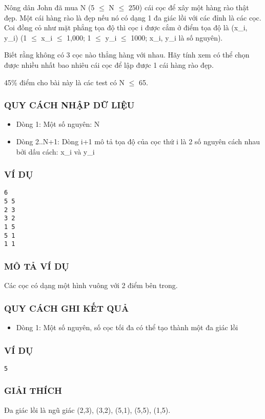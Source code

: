 



   Nông dân John đã mua N (5  $\le$  N  $\le$  250) cái cọc để xây một hàng rào thật đẹp. Một cái hàng rào là đẹp nếu nó có dạng 1 đa giác lồi với các đỉnh là các cọc. Coi đồng cỏ như mặt phẳng tọa độ thì cọc i được cắm ở điểm tọa độ là (x\_i, y\_i) (1  $\le$  x\_i  $\le$  1,000; 1  $\le$  y\_i  $\le$  1000; x\_i, y\_i là số nguyên).  

   Biết rằng không có 3 cọc nào thẳng hàng với nhau. Hãy tính xem có thể chọn được nhiều nhất bao nhiêu cái cọc để lập được 1 cái hàng rào đẹp.  

   45\% điểm cho bài này là các test có N  $\le$  65.  

\subsubsection{   QUY CÁCH NHẬP DỮ LIỆU  }
\begin{itemize}
	\item     Dòng 1: Một số nguyên: N   
	\item     Dòng 2..N+1: Dòng i+1 mô tả tọa độ của cọc thứ i là 2 số nguyên         cách nhau bởi dấu cách: x\_i và y\_i   
\end{itemize}

\subsubsection{   VÍ DỤ  }
\begin{verbatim}
6
5 5
2 3
3 2
1 5
5 1
1 1
\end{verbatim}

\subsubsection{   MÔ TẢ VÍ DỤ  }

   Các cọc có dạng một hình vuông với 2 điểm bên trong.  

\subsubsection{   QUY CÁCH GHI KẾT QUẢ  }
\begin{itemize}
	\item     Dòng 1: Một số nguyên, số cọc tối đa có thể tạo thành một đa giác lồi   
\end{itemize}

\subsubsection{   VÍ DỤ  }
\begin{verbatim}
5
\end{verbatim}

\subsubsection{   GIẢI THÍCH  }

   Đa giác lồi là ngũ giác (2,3), (3,2), (5,1), (5,5), (1,5).  
